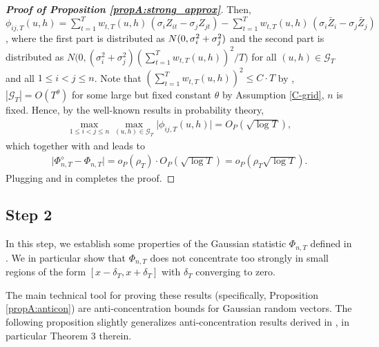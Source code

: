 \documentclass[a4paper,12pt]{article}
\makeatletter
\renewcommand{\eqref}[1]{\tagform@{\ref{#1}}}
\makeatother
\begin{document}
\begin{proof}[\textnormal{\textbf{Proof of Proposition \ref{propA:strong_approx}}}]
Then, $\phi_{ij, T}(u,h) = \sum\nolimits_{t=1}^T w_{t,T}(u,h) \, (\sigma_i Z_{it} - \sigma_j Z_{jt}) - \sum\nolimits_{t=1}^T w_{t,T}(u,h) \, ( \sigma_i \bar{Z}_i - \sigma_j \bar{Z}_j)$, where the first part is distributed as $ N(0,{\sigma}^2_i + {\sigma}^2_j)$ and the second part is distributed as $N\Big(0, (\sigma_i^2 + \sigma_j^2)(\sum_{t=1}^T w_{t, T}(u, h))^2/T\Big)$ for all $(u,h) \in \mathcal{G}_T$ and all $1\le i < j \le n$. Note that $(\sum_{t=1}^T w_{t, T}(u, h))^2 \leq C \cdot T$ by \eqref{ineq-diff-13},  $|\mathcal{G}_T| = O(T^\theta)$ for some large but fixed constant $\theta$ by Assumption \ref{C-grid}, $n$ is fixed. Hence, by the well-known results in probability theory, 
\begin{align}\label{eqA:strong_approx:bound7}
\max_{1\leq i< j \leq n}\max_{(u,h) \in \mathcal{G}_T} \big|\phi_{ij, T}(u,h)\big| = O_P(\sqrt{\log T}),
\end{align}
which together with \eqref{eqA:strong_approx:bound5} and \eqref{eqA:strong_approx:bound6} leads to
\begin{align}\label{eq-strongapprox-bound5}
\big| \Phi_{n, T}^{\diamond} - \Phi_{n, T} \big| = o_P(\rho_T) \cdot O_P(\sqrt{\log T})= o_P(\rho_T \sqrt{\log T}).
\end{align}
Plugging \eqref{eq-strongapprox-bound4} and \eqref{eq-strongapprox-bound5} in \eqref{eq-strongapprox-bound1} completes the proof.
\end{proof}




\subsection*{Step 2}


In this step, we establish some properties of the Gaussian statistic $\Phi_{n,T}$ defined in \eqref{eq:Phi}. We in particular show that $\Phi_{n,T}$ does not concentrate too strongly in small regions of the form $[x-\delta_T,x+\delta_T]$ with $\delta_T$ converging to zero.  

The main technical tool for proving these results (specifically, Proposition \ref{propA:anticon}) are anti-concentration bounds for Gaussian random vectors. The following proposition slightly generalizes anti-concentration results derived in \cite{Chernozhukov2015}, in particular Theorem 3 therein.
\end{document}
